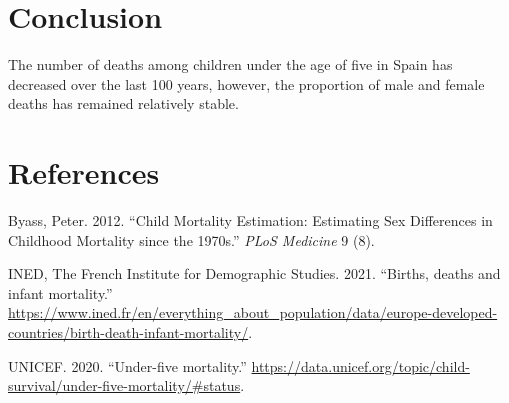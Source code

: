 \documentclass[]{article}
\begin{document}
\section{Conclusion}\label{conclusion}

The number of deaths among children under the age of five in Spain has
decreased over the last 100 years, however, the proportion of male and
female deaths has remained relatively stable.

\newpage

\section*{References}\label{references}

\hypertarget{refs}{}
\hypertarget{ref-Byass2012}{}
Byass, Peter. 2012. ``Child Mortality Estimation: Estimating Sex
Differences in Childhood Mortality since the 1970s.'' \emph{PLoS
Medicine} 9 (8).

\hypertarget{ref-INED}{}
INED, The French Institute for Demographic Studies. 2021. ``Births,
deaths and infant mortality.''
\url{https://www.ined.fr/en/everything_about_population/data/europe-developed-countries/birth-death-infant-mortality/}.

\hypertarget{ref-UNICEF2020}{}
UNICEF. 2020. ``Under-five mortality.''
\url{https://data.unicef.org/topic/child-survival/under-five-mortality/\#status}.
\end{document}
